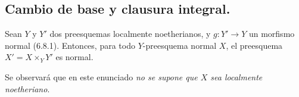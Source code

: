 \subsection{Cambio de base y clausura integral.}
\label{IV.2.s6.14-fr}

\begin{proposition}[6.14.1]
Sean $Y$ y $Y'$ dos preesquemas localmente noetherianos, y
$g:Y'\to Y$ un morfismo normal \textup{(6.8.1)}. Entonces, para todo
$Y$-preesquema normal $X$, el preesquema $X'=X\times_Y Y'$ es normal.
\end{proposition}

Se observará que en este enunciado \emph{no se supone que $X$ sea localmente
noetheriano}.
